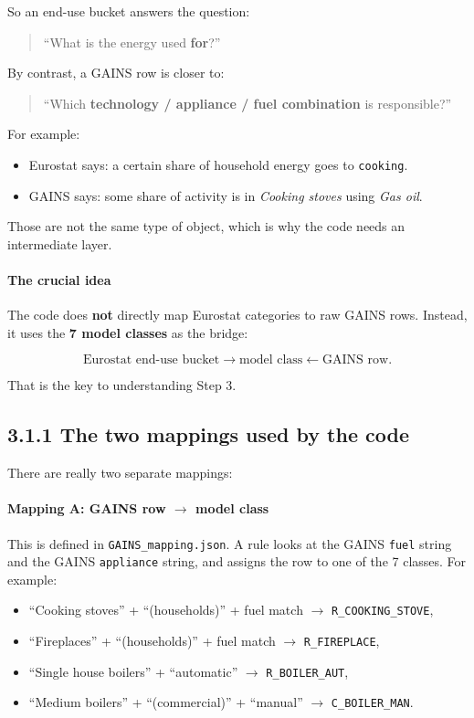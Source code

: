 \documentclass[11pt,a4paper]{article}
\begin{document}
So an end-use bucket answers the question:

\begin{quote}
``What is the energy used \textbf{for}?'' 
\end{quote}

By contrast, a GAINS row is closer to:

\begin{quote}
``Which \textbf{technology / appliance / fuel combination} is responsible?''
\end{quote}

For example:

\begin{itemize}[leftmargin=1.4em]
  \item Eurostat says: a certain share of household energy goes to \texttt{cooking}.
  \item GAINS says: some share of activity is in \emph{Cooking stoves} using \emph{Gas oil}.
\end{itemize}

Those are not the same type of object, which is why the code needs an intermediate layer.

\paragraph{The crucial idea}
The code does \textbf{not} directly map Eurostat categories to raw GAINS rows.
Instead, it uses the \textbf{7 model classes} as the bridge:

\[
\text{Eurostat end-use bucket}
\longrightarrow
\text{model class}
\longleftarrow
\text{GAINS row}.
\]

That is the key to understanding Step 3.

\subsection{3.1.1 The two mappings used by the code}

There are really two separate mappings:

\paragraph{Mapping A: GAINS row $\rightarrow$ model class}
This is defined in \texttt{GAINS\_mapping.json}. A rule looks at the GAINS
\texttt{fuel} string and the GAINS \texttt{appliance} string, and assigns the row
to one of the 7 classes. For example:

\begin{itemize}[leftmargin=1.4em]
  \item ``Cooking stoves'' + ``(households)'' + fuel match $\rightarrow$ \texttt{R\_COOKING\_STOVE},
  \item ``Fireplaces'' + ``(households)'' + fuel match $\rightarrow$ \texttt{R\_FIREPLACE},
  \item ``Single house boilers'' + ``automatic'' $\rightarrow$ \texttt{R\_BOILER\_AUT},
  \item ``Medium boilers'' + ``(commercial)'' + ``manual'' $\rightarrow$ \texttt{C\_BOILER\_MAN}.
\end{itemize}
\end{document}
